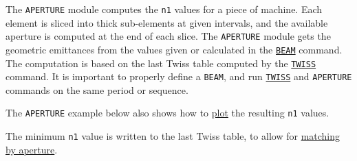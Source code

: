 The \texttt{APERTURE} module computes the \texttt{n1} values for a piece of machine. 
Each element is sliced into thick sub-elements at given intervals, and
the available aperture is computed at the end of each slice. 
The \texttt{APERTURE} module gets the geometric emittances from the values given 
or calculated in the \hyperref[chap:beam]{\texttt{BEAM}} command. 
The computation is based on the last Twiss table computed by the 
\hyperref[chap:twiss]{\texttt{TWISS}} command. 
It is important to properly define a \texttt{BEAM}, and run 
\hyperref[chap:twiss]{\texttt{TWISS}} and \texttt{APERTURE} commands 
on the same period or sequence.

The \texttt{APERTURE} example below also shows how to \hyperref[chap:plot]{plot} 
the resulting \texttt{n1} values.

The minimum \texttt{n1} value is written to the last Twiss table, to
allow for \hyperref[chap:match]{matching by aperture}.


